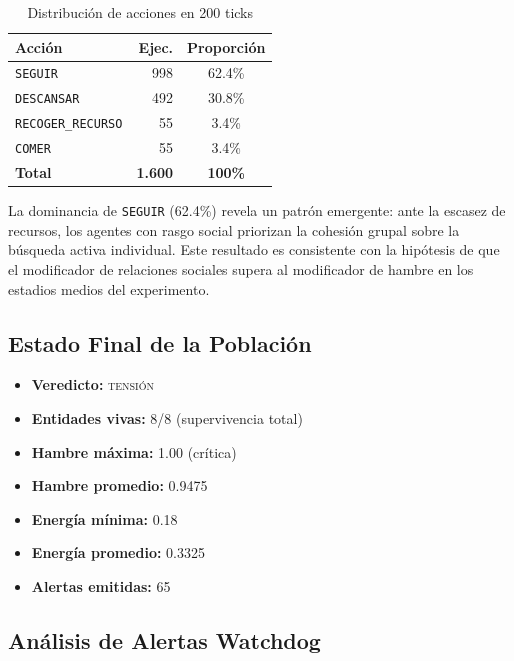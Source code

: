 \documentclass[11pt,a4paper,twocolumn]{article}
\begin{document}
\begin{table}[h]
  \centering
  \caption{Distribución de acciones en 200 ticks}
  \label{tab:acciones}
  \small
  \begin{tabular}{lrc}
    \toprule
    \textbf{Acci\'on} & \textbf{Ejec.} & \textbf{Proporci\'on} \\
    \midrule
    \texttt{SEGUIR}          & 998 & 62.4\% \\
    \texttt{DESCANSAR}       & 492 & 30.8\% \\
    \texttt{RECOGER\_RECURSO} &  55 &  3.4\% \\
    \texttt{COMER}           &  55 &  3.4\% \\
    \midrule
    \textbf{Total}           & \textbf{1.600} & \textbf{100\%} \\
    \bottomrule
  \end{tabular}
\end{table}

La dominancia de \texttt{SEGUIR} (62.4\%) revela un patr\'on emergente:
ante la escasez de recursos, los agentes con rasgo social priorizan la
cohesi\'on grupal sobre la b\'usqueda activa individual. Este resultado
es consistente con la hip\'otesis de que el modificador de relaciones
sociales supera al modificador de hambre en los estadios medios del
experimento.

\subsection{Estado Final de la Poblaci\'on}

\begin{itemize}[leftmargin=1em, itemsep=2pt, topsep=2pt]
  \item \textbf{Veredicto:} \textcolor{warncolor}{\textsc{tensi\'on}}
  \item \textbf{Entidades vivas:} 8/8 (supervivencia total)
  \item \textbf{Hambre m\'axima:} 1.00 (cr\'itica)
  \item \textbf{Hambre promedio:} 0.9475
  \item \textbf{Energ\'ia m\'inima:} 0.18
  \item \textbf{Energ\'ia promedio:} 0.3325
  \item \textbf{Alertas emitidas:} 65
\end{itemize}

\subsection{An\'alisis de Alertas Watchdog}
\end{document}
